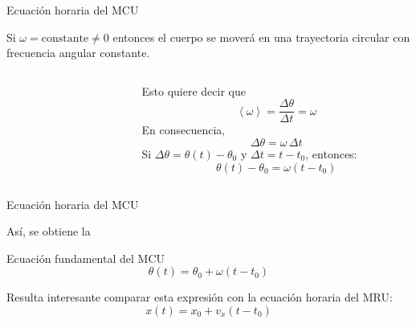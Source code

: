 \documentclass[11pt,handout,aspectratio=1610]{beamer}
\newcommand{\valmed}[1]{\left\langle #1 \right\rangle}
\begin{document}
\begin{frame}{Ecuación horaria del MCU}

    Si $\omega = \text{constante} \neq 0$ entonces el cuerpo se moverá en una trayectoria circular con frecuencia angular constante.

    \begin{columns}
        \begin{column}{0.5\textwidth}
            \begin{figure}[h]
                \centering
            \end{figure}
        \end{column}
        \begin{column}{0.5\textwidth}
            Esto quiere decir que $$\valmed{\omega} = \frac{\Delta \theta}{\Delta t} = \omega$$ \pause En consecuencia, $$\Delta \theta = \omega \, \Delta t$$ Si $\Delta \theta = \theta (t) - \theta_0$ y $\Delta t = t - t_0$, \pause entonces: $$\theta (t) - \theta_0 = \omega \left( t - t_0\right)$$
        \end{column}
    \end{columns}

\end{frame}

\begin{frame}{Ecuación horaria del MCU} 

    Así, se obtiene la 
    \begin{block}{Ecuación fundamental del MCU}
    $$\theta (t) = \theta_0 + \omega \left( t - t_0\right)$$ 
    \end{block} Resulta interesante comparar esta expresión con la ecuación horaria del MRU: $$x(t) = x_0 + v_x \left(t - t_0\right)$$

\end{frame}
\end{document}

